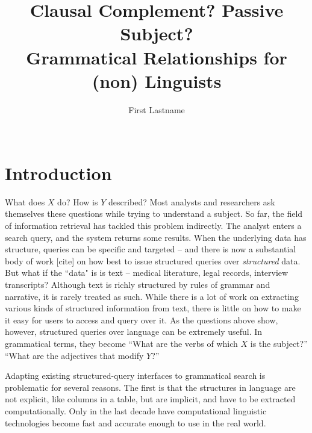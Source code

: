 \documentclass{sigchi}
\begin{document}
\title{Clausal Complement? Passive Subject?\\Grammatical Relationships for (non) Linguists}

\author{%
\alignauthor First Lastname\\
\\
}

\maketitle

\begin{abstract}

\end{abstract}

\section{Introduction}

What does $X$ do? How is $Y$ described? Most analysts and researchers ask themselves these questions while trying to understand a subject.  So far, the field of information retrieval has tackled this problem indirectly. The analyst enters a search query, and the system returns some results. When the underlying data has structure, queries can be specific and targeted -- and there is now a substantial body of work [cite] on how best to issue structured queries over \emph{structured} data. But what if the ``data" is is text -- medical literature, legal records, interview transcripts? Although text is richly structured by rules of  grammar and narrative, it is rarely treated as such. While there is a lot of work on extracting various kinds of structured information from text, there is little on how to make it easy for users to access and query over it.  As the questions above show, however, structured queries over language can be extremely useful. In grammatical terms, they become ``What are the verbs of which $X$ is the subject?'' ``What are the adjectives that modify $Y$?''  

Adapting existing structured-query interfaces to grammatical search is problematic for several reasons. The first is that the structures in language are not explicit, like columns in a table, but are implicit, and have to be extracted computationally. Only in the last decade have computational linguistic technologies become fast and accurate enough to use in the real world. 
\end{document}
